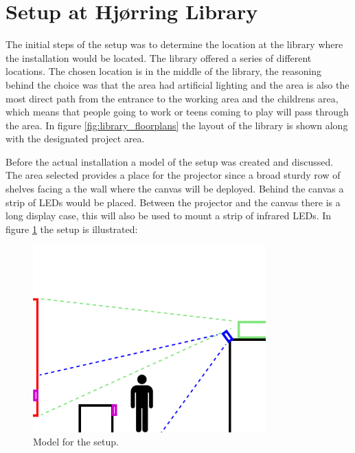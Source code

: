 \section{Setup at Hj{\o}rring Library}

The initial steps of the setup was to determine the location at the library where the installation would be located. The library offered a series of different locations. The chosen location is in the middle of the library, the reasoning behind the choice was that the area had artificial lighting and the area is also the most direct path from the entrance to the working area and the childrens area, which means that people going to work or teens coming to play will pass through the area. In figure \ref{fig:library_floorplans} the layout of the library is shown along with the designated project area.


Before the actual installation a model of the setup was created and discussed. The area selected provides a place for the projector since a broad sturdy row of shelves facing a the wall where the canvas will be deployed. Behind the canvas a strip of LEDs would be placed. Between the projector and the canvas there is a long display case, this will also be used to mount a strip of infrared LEDs. In figure \ref{fig:setup_model} the setup is illustrated:

\begin{figure}[htbp] 
\centering 
\includegraphics[width=0.8\textwidth]{Pictures/Setup/sideview_camera_with_person_two_strips.png} 
\caption{Model for the setup.} 
\label{fig:setup_model} 
\end{figure}

